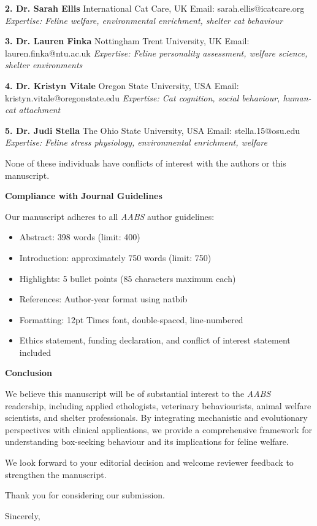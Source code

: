 \documentclass[11pt]{letter}
\begin{document}
\begin{letter}
\textbf{2. Dr. Sarah Ellis}  
International Cat Care, UK  
Email: sarah.ellis@icatcare.org  
\textit{Expertise: Feline welfare, environmental enrichment, shelter cat behaviour}

\textbf{3. Dr. Lauren Finka}  
Nottingham Trent University, UK  
Email: lauren.finka@ntu.ac.uk  
\textit{Expertise: Feline personality assessment, welfare science, shelter environments}

\textbf{4. Dr. Kristyn Vitale}  
Oregon State University, USA  
Email: kristyn.vitale@oregonstate.edu  
\textit{Expertise: Cat cognition, social behaviour, human-cat attachment}

\textbf{5. Dr. Judi Stella}  
The Ohio State University, USA  
Email: stella.15@osu.edu  
\textit{Expertise: Feline stress physiology, environmental enrichment, welfare}

None of these individuals have conflicts of interest with the authors or this manuscript.

\textbf{Compliance with Journal Guidelines}

Our manuscript adheres to all \textit{AABS} author guidelines:

\begin{itemize}
    \item Abstract: 398 words (limit: 400)
    \item Introduction: approximately 750 words (limit: 750)
    \item Highlights: 5 bullet points (85 characters maximum each)
    \item References: Author-year format using natbib
    \item Formatting: 12pt Times font, double-spaced, line-numbered
    \item Ethics statement, funding declaration, and conflict of interest statement included
\end{itemize}

\textbf{Conclusion}

We believe this manuscript will be of substantial interest to the \textit{AABS} readership, including applied ethologists, veterinary behaviourists, animal welfare scientists, and shelter professionals. By integrating mechanistic and evolutionary perspectives with clinical applications, we provide a comprehensive framework for understanding box-seeking behaviour and its implications for feline welfare.

We look forward to your editorial decision and welcome reviewer feedback to strengthen the manuscript.

Thank you for considering our submission.

\closing{Sincerely,}

\end{letter}
\end{document}
